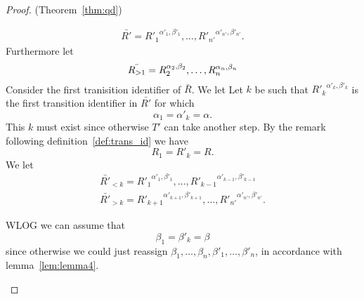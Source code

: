 \begin{proof}{(Theorem~\ref{thm:qd})}
\begin{description}
\begin{equation*}
\begin{gathered}
          \bar{R'} = {R'_1}^{\alpha'_1, \beta'_1}, \dots, {R'_{n'}}^{\alpha'_{n'},
          \beta'_{n'}}.
        \end{gathered}
      \end{equation*}
      Furthermore let
      \begin{equation*}
        \bar{R_{>1}} = R_2^{\alpha_2, \beta_2}, \dots, R_n^{\alpha_n, \beta_n} \\
      \end{equation*}
      Consider the first tranisition identifier of $\bar{R}$. We let
      Let $k$ be such
      that ${R'_k}^{\alpha'_k, \beta'_k}$ is the first transition identifier in
      $\bar{R'}$ for which 
      \begin{equation*}
        \alpha_1 = \alpha'_k = \alpha.
      \end{equation*} 
      This $k$ must exist since
      otherwise $T'$ can take another step. By the remark following
      definition~\ref{def:trans_id} we have 
      \begin{equation*}
        R_1 = R'_k = R.
      \end{equation*} 
      We let
      \begin{equation*}
        \begin{gathered}
          \bar{R'}_{<k} = {R'_1}^{\alpha'_1, \beta'_1}, \dots,
          {R'_{k-1}}^{\alpha'_{k-1}, \beta'_{k-1}}  \\
          \bar{R'}_{>k} = {R'_{k+1}}^{\alpha'_{k+1}, \beta'_{k+1}}, \dots,
          {R'_{n'}}^{\alpha'_{n'}, \beta'_{n'}}.
        \end{gathered}
      \end{equation*}

      WLOG we can assume that
      \begin{equation*}
        \beta_1 = \beta'_k = \beta
      \end{equation*}
      since otherwise we could just reassign $\beta_1, \dots, \beta_n, \beta'_1, \dots,
      \beta'_n$, in accordance with lemma~\ref{lem:lemma4}.

%


\end{description}
\end{proof}
